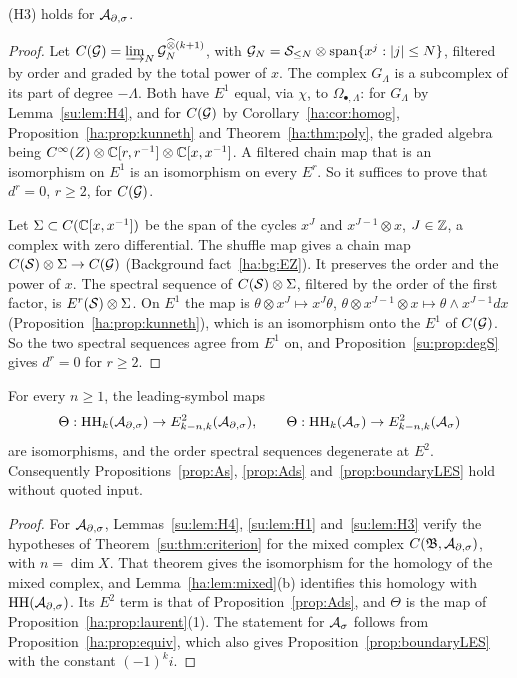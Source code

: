 \begin{lemma}\label{su:lem:H3}
(H3) holds for \(\mathcal A_{\partial,\sigma}\).
\end{lemma}

\begin{proof}
Let \(C(\mathcal G)=\varinjlim_N\mathcal G_N^{\mathbin{\widehat\otimes}(k+1)}\), with
\(\mathcal G_N=\mathcal S_{\le N}\otimes\mathrm{span}\{x^j:|j|\le N\}\), filtered by
order and graded by the total power of \(x\). The complex \(G_\Lambda\) is
a subcomplex of its part of degree \(-\Lambda\). Both have \(E^1\) equal,
via \(\chi\), to \(\Omega_{\bullet,\Lambda}\): for \(G_\Lambda\) by
Lemma~\ref{su:lem:H4}, and for \(C(\mathcal G)\) by
Corollary~\ref{ha:cor:homog}, Proposition~\ref{ha:prop:kunneth} and
Theorem~\ref{ha:thm:poly}, the graded algebra being
\(C^\infty(Z)\otimes\mathbb C[r,r^{-1}]\otimes\mathbb C[x,x^{-1}]\). A filtered chain map
that is an isomorphism on \(E^1\) is an isomorphism on every \(E^r\). So
it suffices to prove that \(d^r=0\), \(r\ge2\), for \(C(\mathcal G)\).

Let \(\Sigma\subset C(\mathbb C[x,x^{-1}])\) be the span of the cycles \(x^J\)
and \(x^{J-1}\otimes x\), \(J\in\mathbb Z\), a complex with zero differential.
The shuffle map gives a chain map \(C(\mathcal S)\otimes\Sigma\to C(\mathcal G)\)
(Background fact~\ref{ha:bg:EZ}). It preserves the order and the power of
\(x\). The spectral sequence of \(C(\mathcal S)\otimes\Sigma\), filtered by
the order of the first factor, is \(E^r(\mathcal S)\otimes\Sigma\). On
\(E^1\) the map is \(\theta\otimes x^J\mapsto x^J\theta\),
\(\theta\otimes x^{J-1}\otimes x\mapsto\theta\wedge x^{J-1}dx\)
(Proposition~\ref{ha:prop:kunneth}), which is an isomorphism onto the
\(E^1\) of \(C(\mathcal G)\). So the two spectral sequences agree from \(E^1\)
on, and Proposition~\ref{su:prop:degS} gives \(d^r=0\) for \(r\ge2\).
\end{proof}

\begin{theorem}\label{su:thm:B10}
For every \(n\ge1\), the leading-symbol maps
\[
 \Theta:\operatorname{HH}_k(\mathcal A_{\partial,\sigma})\to E^2_{k-n,k}(\mathcal A_{\partial,\sigma}),\qquad
 \Theta:\operatorname{HH}_k(\mathcal A_\sigma)\to E^2_{k-n,k}(\mathcal A_\sigma)
\]
are isomorphisms, and the order spectral sequences degenerate at \(E^2\).
Consequently Propositions~\ref{prop:As}, \ref{prop:Ads}
and~\ref{prop:boundaryLES} hold without quoted input.
\end{theorem}

\begin{proof}
For \(\mathcal A_{\partial,\sigma}\), Lemmas~\ref{su:lem:H4}, \ref{su:lem:H1} and~\ref{su:lem:H3}
verify the hypotheses of Theorem~\ref{su:thm:criterion} for the mixed
complex \(C(\mathfrak B,\mathcal A_{\partial,\sigma})\), with \(n=\dim X\). That theorem gives the
isomorphism for the homology of the mixed complex, and
Lemma~\ref{ha:lem:mixed}(b) identifies this homology with
\(\operatorname{HH}(\mathcal A_{\partial,\sigma})\). Its \(E^2\) term is that of Proposition~\ref{prop:Ads}, and
\(\Theta\) is the map of Proposition~\ref{ha:prop:laurent}(1). The
statement for \(\mathcal A_\sigma\) follows from Proposition~\ref{ha:prop:equiv}, which
also gives Proposition~\ref{prop:boundaryLES} with the constant
\((-1)^ki\).
\end{proof}

